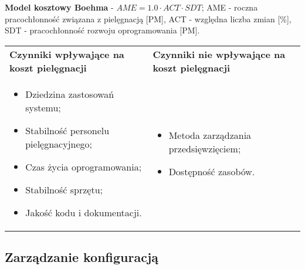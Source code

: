 \documentclass[../main.tex]{subfiles}
\begin{document}
    \textbf{Model kosztowy Boehma} - $AME = 1.0 \cdot ACT \cdot SDT$; AME - roczna pracochłonność związana
    z pielęgnacją [PM], ACT - względna liczba zmian [\%], SDT - pracochłonność rozwoju oprogramowania [PM].


    \begin{table}[H]
        \begin{center}
            \begin{tabular}{p{.5\linewidth} p{.5\linewidth}}
                \textbf{Czynniki wpływające na koszt pielęgnacji} & \textbf{Czynniki nie wpływające na koszt pielęgnacji}\\

                \begin{itemize}
                    \item  Dziedzina zastosowań systemu;
                    \item Stabilność personelu pielęgnacyjnego;
                    \item Czas życia oprogramowania;
                    \item Stabilność sprzętu;
                    \item Jakość kodu i dokumentacji.
                \end{itemize}
                &
                \begin{itemize}
                    \item Metoda zarządzania przedsięwzięciem;
                    \item Dostępność zasobów.
                \end{itemize}
            \end{tabular}
        \end{center}
    \end{table}

    \subsection{Zarządzanie konfiguracją}
\end{document}
